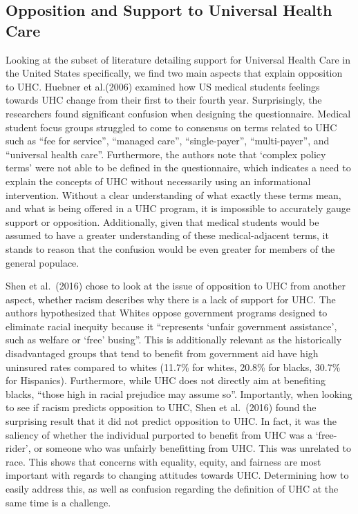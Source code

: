 \documentclass[
]{article}
\begin{document}
\hypertarget{opposition-and-support-to-universal-health-care}{%
\subsection{Opposition and Support to Universal Health
Care}\label{opposition-and-support-to-universal-health-care}}

Looking at the subset of literature detailing support for Universal
Health Care in the United States specifically, we find two main aspects
that explain opposition to UHC. Huebner et al.(2006) examined how US
medical students feelings towards UHC change from their first to their
fourth year. Surprisingly, the researchers found significant confusion
when designing the questionnaire. Medical student focus groups struggled
to come to consensus on terms related to UHC such as ``fee for
service'', ``managed care'', ``single-payer'', ``multi-payer'', and
``universal health care''. Furthermore, the authors note that `complex
policy terms' were not able to be defined in the questionnaire, which
indicates a need to explain the concepts of UHC without necessarily
using an informational intervention. Without a clear understanding of
what exactly these terms mean, and what is being offered in a UHC
program, it is impossible to accurately gauge support or opposition.
Additionally, given that medical students would be assumed to have a
greater understanding of these medical-adjacent terms, it stands to
reason that the confusion would be even greater for members of the
general populace.

Shen et al.~(2016) chose to look at the issue of opposition to UHC from
another aspect, whether racism describes why there is a lack of support
for UHC. The authors hypothesized that Whites oppose government programs
designed to eliminate racial inequity because it ``represents `unfair
government assistance', such as welfare or `free' busing''. This is
additionally relevant as the historically disadvantaged groups that tend
to benefit from government aid have high uninsured rates compared to
whites (11.7\% for whites, 20.8\% for blacks, 30.7\% for Hispanics).
Furthermore, while UHC does not directly aim at benefiting blacks,
``those high in racial prejudice may assume so''. Importantly, when
looking to see if racism predicts opposition to UHC, Shen et al.~(2016)
found the surprising result that it did not predict opposition to UHC.
In fact, it was the saliency of whether the individual purported to
benefit from UHC was a `free-rider', or someone who was unfairly
benefitting from UHC. This was unrelated to race. This shows that
concerns with equality, equity, and fairness are most important with
regards to changing attitudes towards UHC. Determining how to easily
address this, as well as confusion regarding the definition of UHC at
the same time is a challenge.
\end{document}
